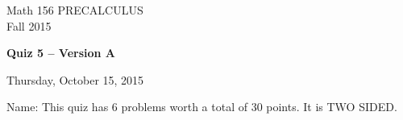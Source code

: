 \documentclass[11pt]{article}
\begin{document}
\begin{center}
\vspace{2in}

\huge{Math 156 PRECALCULUS \\
Fall 2015}

\vfill

\huge{\bf{Quiz 5 -- Version A}}\\

\vspace{0.5in}

\large{Thursday, October 15, 2015}\\

\vfill


{\huge{Name:{\underline{\hspace{2in}}}}}
\vfill
This quiz has 6 problems worth a total of 30 points. It is TWO SIDED. 
\vfill
\end{center}
\newpage
\restoregeometry
\end{document}
